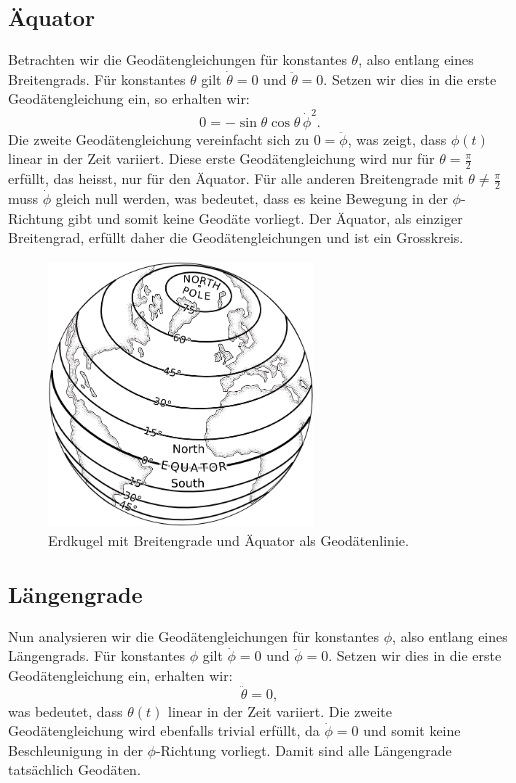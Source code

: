 \subsection{Äquator}
Betrachten wir die Geodätengleichungen für konstantes $\theta$, also entlang eines Breitengrads.
Für konstantes $\theta$ gilt $\dot{\theta} = 0$ und $\ddot{\theta} = 0$.
Setzen wir dies in die erste Geodätengleichung ein, so erhalten wir:
\begin{equation}
	0 = -\sin\theta \cos\theta \, \dot{\phi}^2.
\end{equation}
Die zweite Geodätengleichung vereinfacht sich zu $0 = \ddot{\phi}$, was zeigt, dass $\phi(t)$ linear in der Zeit variiert.
Diese erste Geodätengleichung wird nur für $\theta = \frac{\pi}{2}$ erfüllt, das heisst, nur für den Äquator.
Für alle anderen Breitengrade mit $\theta \neq \frac{\pi}{2}$ muss $\dot{\phi}$ gleich null werden, was bedeutet, dass es keine Bewegung in der $\phi$-Richtung gibt und somit keine Geodäte vorliegt.
Der Äquator, als einziger Breitengrad, erfüllt daher die Geodätengleichungen und ist ein Grosskreis.

\begin{figure}
	\centering
	\includegraphics[width=7cm]{papers/geodaeten/Abbildungen/Standardverfahren/StaKugelBreitengrade}
	\caption{Erdkugel mit Breitengrade und Äquator als Geodätenlinie.}
	\label{geodaeten:figure:Standardverfahren:Breitengrade}
\end{figure}

\subsection{Längengrade}
Nun analysieren wir die Geodätengleichungen für konstantes $\phi$, also entlang eines Längengrads.
Für konstantes $\phi$ gilt $\dot{\phi} = 0$ und $\ddot{\phi} = 0$.
Setzen wir dies in die erste Geodätengleichung ein, erhalten wir:
\begin{equation}
	\ddot{\theta} = 0,
\end{equation}
was bedeutet, dass $\theta(t)$ linear in der Zeit variiert.
Die zweite Geodätengleichung wird ebenfalls trivial erfüllt, da $\dot{\phi} = 0$ und somit keine Beschleunigung in der $\phi$-Richtung vorliegt.
Damit sind alle Längengrade tatsächlich Geodäten.

